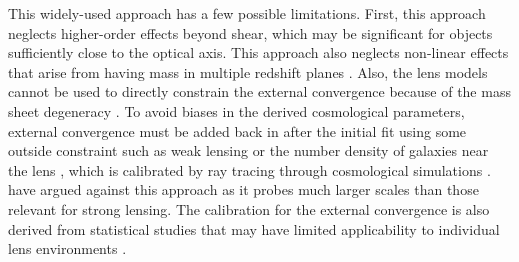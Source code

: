 This widely-used approach has a few possible limitations. First, this approach neglects higher-order effects beyond shear, which may be significant for objects sufficiently close to the optical axis. This approach also neglects non-linear effects that arise from having mass in multiple redshift planes \citep[][]{McCully14,Jaroszynski12}. Also, the lens models cannot be used to directly constrain the external convergence because of the mass sheet degeneracy \citep{Falco85}.  To avoid biases in the derived cosmological parameters, external convergence must be added back in after the initial fit using some outside constraint such as weak lensing \citep{Nakajima09, Fadely10} or the number density of galaxies near the lens \citep{Suyu10, Suyu13, Collett13}, which is calibrated by ray tracing through cosmological simulations \citep[e.g.,][]{Hilbert09}. \citet{Schneider13} have argued against this approach as it probes much larger scales than those relevant for strong lensing. The calibration for the external convergence is also derived from statistical studies that may have limited applicability to individual lens environments \citep{Wong11}.
  